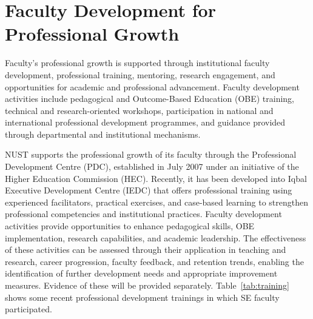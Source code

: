 \section{Faculty Development for Professional Growth}
Faculty's professional growth is supported through institutional faculty development, professional training, mentoring, research engagement, and opportunities for academic and professional advancement. Faculty development activities include pedagogical and Outcome-Based Education (OBE) training, technical and research-oriented workshops, participation in national and international professional development programmes, and guidance provided through departmental and institutional mechanisms. 

NUST supports the professional growth of its faculty through the Professional Development Centre (PDC), established in July 2007 under an initiative of the Higher Education Commission (HEC). Recently, it has been developed into Iqbal Executive Development Centre (IEDC) that offers professional training using experienced facilitators, practical exercises, and case-based learning to strengthen professional competencies and institutional practices. Faculty development activities provide opportunities to enhance pedagogical skills, OBE implementation, research capabilities, and academic leadership. The effectiveness of these activities can be assessed through their application in teaching and research, career progression, faculty feedback, and retention trends, enabling the identification of further development needs and appropriate improvement measures. Evidence of these will be provided separately. Table~\ref{tab:training} shows some recent professional development trainings in which SE faculty participated.

